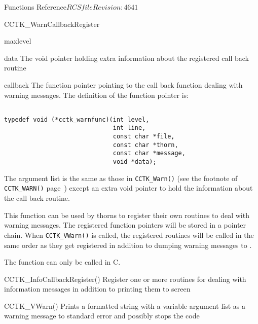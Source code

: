 \begin{cactuspart}{ Functions Reference}{$RCSfile$}{$Revision: 4641 $}
\begin{FunctionDescription}{CCTK\_WarnCallbackRegister}
\begin{ParameterSection}
\begin{Parameter}{maxlevel}
\end{Parameter}

\begin{Parameter}{data}
The void pointer holding extra information about the registered call back
routine
\end{Parameter}

\begin{Parameter}{callback}
The function pointer pointing to the call back function dealing with
warning messages. The definition of the function pointer is:
\begin{verbatim}

typedef void (*cctk_warnfunc)(int level,
                              int line,
                              const char *file,
                              const char *thorn,
                              const char *message,
                              void *data);

\end{verbatim}

The argument list is the same as those in \verb|CCTK_Warn()|
(see the footnote of \verb|CCTK_WARN()| page~\pageref{CCTK-WARN})
except an extra void pointer to hold the information about the call
back routine.

\end{Parameter}

\end{ParameterSection}

\begin{Discussion}
This function can be used by thorns to register their own routines to
deal with warning messages. The registered function pointers will be
stored in a pointer chain. When \verb|CCTK_VWarn()| is called, the
registered routines will be called in the same order as they get
registered in addition to dumping warning messages to .

The function can only be called in C.
\end{Discussion}

\begin{SeeAlsoSection}
\begin{SeeAlso}{CCTK\_InfoCallbackRegister()}
Register one or more routines for dealing with information messages in
addition to printing them to screen
\end{SeeAlso}

\begin{SeeAlso}{CCTK\_VWarn()}
Prints a formatted string with a variable argument list as a warning message
to standard error and possibly stops the code
\end{SeeAlso}


\end{SeeAlsoSection}
\end{FunctionDescription}
\end{cactuspart}
